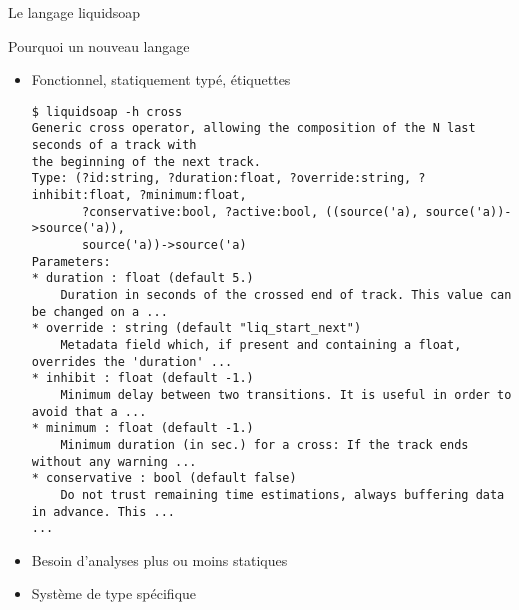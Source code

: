 \documentclass{beamer}
\begin{document}

\begin{frame}[fragile]{Le langage liquidsoap}

  \begin{block}{Pourquoi un nouveau langage}
  \begin{itemize}
    \item Fonctionnel, statiquement typé, étiquettes
\begin{center}\tiny\begin{verbatim}
$ liquidsoap -h cross
Generic cross operator, allowing the composition of the N last seconds of a track with
the beginning of the next track.
Type: (?id:string, ?duration:float, ?override:string, ?inhibit:float, ?minimum:float,
       ?conservative:bool, ?active:bool, ((source('a), source('a))->source('a)),
       source('a))->source('a)
Parameters:
* duration : float (default 5.)
    Duration in seconds of the crossed end of track. This value can be changed on a ...
* override : string (default "liq_start_next")
    Metadata field which, if present and containing a float, overrides the 'duration' ...
* inhibit : float (default -1.)
    Minimum delay between two transitions. It is useful in order to avoid that a ...
* minimum : float (default -1.)
    Minimum duration (in sec.) for a cross: If the track ends without any warning ...
* conservative : bool (default false)
    Do not trust remaining time estimations, always buffering data in advance. This ...
...
\end{verbatim}\end{center}
    \item Besoin d'analyses plus ou moins statiques
    \item Système de type spécifique
  \end{itemize}
  \end{block}


\end{frame}
\end{document}
